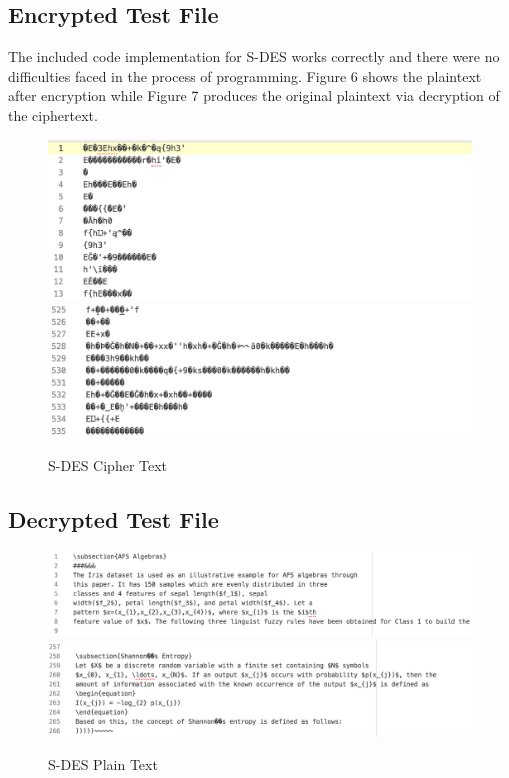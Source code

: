 \documentclass[]{article}
\begin{document}
\newpage
\subsection*{Encrypted Test File}

The included code implementation for S-DES works correctly and there were no difficulties faced in the process of programming. Figure 6 shows the plaintext after encryption while Figure 7 produces the original plaintext via decryption of the ciphertext.

\begin{figure}[H]
	\includegraphics[height=\textheight/6,width=\textwidth]{sdes_cipher1.png}
	\includegraphics[height=\textheight/6,width=\textwidth]{sdes_cipher2.png}	
	\caption{S-DES Cipher Text}
	\centering
\end{figure}

\vspace{0.5cm}
\subsection*{Decrypted Test File}

\begin{figure}[H]
	\includegraphics[width=\textwidth]{sdes_plain1.png}
	\includegraphics[width=\textwidth]{sdes_plain2.png}	
	\caption{S-DES Plain Text}
	\centering
\end{figure}
\end{document}
